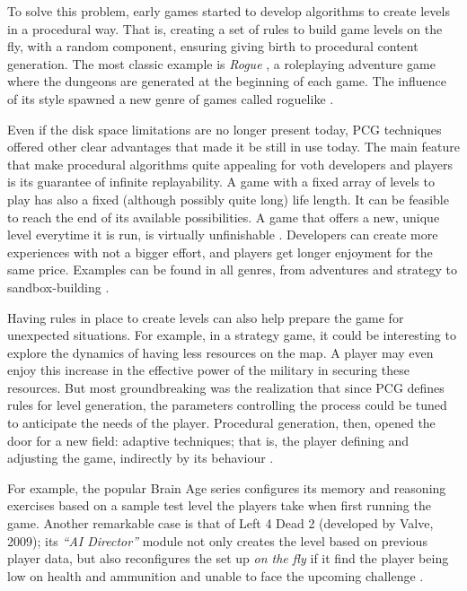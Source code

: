 \documentclass[conference]{IEEEtran}
\begin{document}
To solve this problem, early games started to develop algorithms to create levels in a procedural way. That is, creating a set of rules to build game levels on the fly, with a random component, ensuring  giving birth to procedural content generation. The most classic example is \textit{Rogue} \cite{rogue}, a roleplaying adventure game where the dungeons are generated at the beginning of each game. The influence of its style spawned a new genre of games called roguelike \cite{roguelike}.

Even if the disk space limitations are no longer present today, PCG techniques offered other clear advantages that made it be still in use today. The main feature that make procedural algorithms quite appealing for voth developers and players is its guarantee of infinite replayability. A game with a fixed array of levels to play has also a fixed (although possibly quite long) life length. It can be feasible to reach the end of its available possibilities. A game that offers a new, unique level everytime it is run, is virtually unfinishable \cite{rodenparberry2004}. Developers can create more experiences with not a bigger effort, and players get longer enjoyment for the same price. Examples can be found in all genres, from adventures \cite{diablo} and strategy \cite{civilization} to sandbox-building \cite{minecraft}.

Having rules in place to create levels can also help prepare the game for unexpected situations. For example, in a strategy game, it could be interesting to explore the dynamics of having less resources on the map. A player may even enjoy this increase in the effective power of the military in securing these resources. But most groundbreaking was the realization that since PCG defines rules for level generation, the parameters controlling the process could be tuned to anticipate the needs of the player. Procedural generation, then, opened the door for a new field: adaptive techniques; that is, the player defining and adjusting the game, indirectly by its behaviour \cite{mmorpg06}. 

For example, the popular Brain Age series \cite{brainage} configures its memory and reasoning exercises based on a sample test level the players take when first running the game. Another remarkable case is that of Left 4 Dead 2 (developed by Valve, 2009); its \textit{``AI Director''} module not only creates the level based on previous player data, but also reconfigures the set up \textit{on the fly} if it find the player being low on health and ammunition and unable to face the upcoming challenge \cite{l4d09}.
\end{document}
